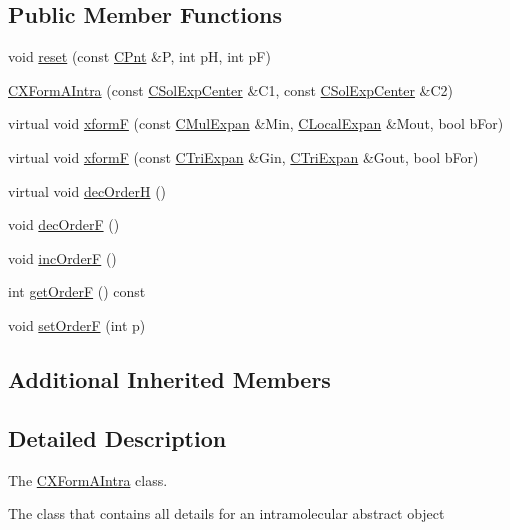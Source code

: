 \subsection*{Public Member Functions}
\begin{DoxyCompactItemize}
\item 
void \hyperlink{classCXFormAIntra_a01da18ef969852137ac66efabaa1c0a7}{reset} (const \hyperlink{classCPnt}{C\-Pnt} \&P, int p\-H, int p\-F)
\item 
\hyperlink{classCXFormAIntra_ae1c2353a8322b51861a34db57ade6ca0}{C\-X\-Form\-A\-Intra} (const \hyperlink{classCSolExpCenter}{C\-Sol\-Exp\-Center} \&C1, const \hyperlink{classCSolExpCenter}{C\-Sol\-Exp\-Center} \&C2)
\item 
virtual void \hyperlink{classCXFormAIntra_ab39d168aca3d0a247da8a0dca88d676b}{xform\-F} (const \hyperlink{classCMulExpan}{C\-Mul\-Expan} \&Min, \hyperlink{classCLocalExpan}{C\-Local\-Expan} \&Mout, bool b\-For)
\item 
virtual void \hyperlink{classCXFormAIntra_ad9c2a0dcde81751a71e49fb92d31919b}{xform\-F} (const \hyperlink{classCTriExpan}{C\-Tri\-Expan} \&Gin, \hyperlink{classCTriExpan}{C\-Tri\-Expan} \&Gout, bool b\-For)
\item 
virtual void \hyperlink{classCXFormAIntra_ae8be84c9a7a07d03fe24d941317fb40a}{dec\-Order\-H} ()
\item 
void \hyperlink{classCXFormAIntra_a87c39f1867c3651309364f33d52e70fd}{dec\-Order\-F} ()
\item 
void \hyperlink{classCXFormAIntra_ae9b0e731644f94182cbd9d1f35248975}{inc\-Order\-F} ()
\item 
int \hyperlink{classCXFormAIntra_aea505950be2ea23080eb697049195843}{get\-Order\-F} () const 
\item 
void \hyperlink{classCXFormAIntra_a0798bc5e1f8ddced4fce0171b4ac5c47}{set\-Order\-F} (int p)
\end{DoxyCompactItemize}
\subsection*{Additional Inherited Members}


\subsection{Detailed Description}
The \hyperlink{classCXFormAIntra}{C\-X\-Form\-A\-Intra} class. 

The class that contains all details for an intramolecular abstract object 

